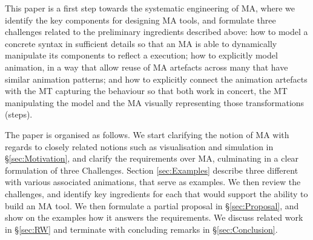 This paper is a first step towards the systematic engineering of MA, where we 
identify the key components for designing MA tools, and formulate three challenges
related to the preliminary ingredients described above: how to model a concrete 
syntax in sufficient details so that an MA is able to dynamically manipulate its
components to reflect a \DSL execution; how to explicitly model animation, in a way
that allow reuse of MA artefacts across many \DSLs that have similar animation patterns;
and how to explicitly connect the animation artefacts with the MT capturing the
\DSL behaviour so that both work in concert, the MT manipulating the model and 
the MA visually representing those transformations (steps).

The paper is organised as follows. We start clarifying the notion of MA with regards
to closely related notions such as visualisation and simulation in \S \ref{sec:Motivation},
and clarify the requirements over MA, culminating in a clear formulation of three
Challenges. Section \ref{sec:Examples} describe three different \DSLs with 
various associated animations, that serve as examples. We then review the challenges,
and identify key ingredients for each that would support the ability to build
an MA tool. We then formulate a partial proposal in \S \ref{sec:Proposal},
and show on the examples how it answers the requirements. We discuss related work
in \S \ref{sec:RW} and terminate with concluding remarks in \S \ref{sec:Conclusion}.
